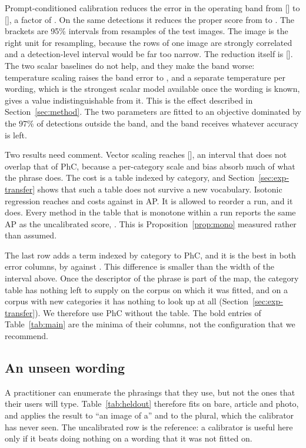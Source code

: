 Prompt-conditioned calibration reduces the error in the operating band from \BANDID{}
[\BANDIDCI] to \BANDPHC{} [\BANDPHCCI], a factor of \FACTOR. On the same detections it reduces the
proper score from \BANDBSID{} to \BANDBS. The brackets are 95\% intervals from \BOOTN{} resamples
of the test images. The image is the right unit for resampling, because the rows of one image are
strongly correlated and a detection-level interval would be far too narrow. The reduction itself
is \DROP{} [\DROPCD]. The two scalar baselines do not help, and they make the band worse:
temperature scaling raises the band error to \BANDTEMP, and a separate temperature per wording,
which is the strongest scalar model available once the wording is known, gives a value
indistinguishable from it. This is the effect described in Section~\ref{sec:method}. The two
parameters are fitted to an objective dominated by the $97\%$ of detections outside the band, and
the band receives whatever accuracy is left.

Two results need comment. Vector scaling reaches \BANDVEC{} [\BANDVECCI], an interval that does
not overlap that of PhC, because a per-category scale and bias absorb much of what the phrase
does. The cost is a table indexed by category, and Section~\ref{sec:exp-transfer} shows that
such a table does not survive a new vocabulary. Isotonic regression reaches \BANDISO{} and costs
\APISO{} against \APID{} in AP. It is allowed to reorder a run, and it does. Every method in the
table that is monotone within a run reports the same AP as the uncalibrated score, \APID. This is
Proposition~\ref{prop:mono} measured rather than assumed.

The last row adds a term indexed by category to PhC, and it is the best in both error columns, by
\BANDCATF{} against \BANDPHCF. This difference is smaller than the width of the interval above.
Once the descriptor of the phrase is part of the map, the category table has nothing left to
supply on the corpus on which it was fitted, and on a corpus with new categories it has nothing
to look up at all (Section~\ref{sec:exp-transfer}). We therefore use PhC without the table. The
bold entries of Table~\ref{tab:main} are the minima of their columns, not the configuration that
we recommend.

\subsection{An unseen wording}\label{sec:exp-heldout}

A practitioner can enumerate the phrasings that they use, but not the ones that their users will
type. Table~\ref{tab:heldout} therefore fits on bare, article and photo, and applies the result
to ``an image of a'' and to the plural, which the calibrator has never seen. The uncalibrated row
is the reference: a calibrator is useful here only if it beats doing nothing on a wording that it
was not fitted on.

